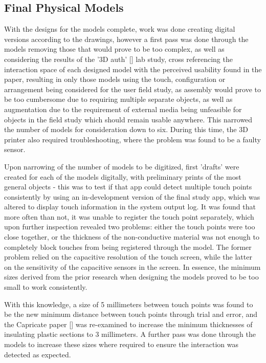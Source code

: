 \documentclass{l4proj}
\begin{document}
\subsection{Final Physical Models} \label{ssecmodels}
   
With the designs for the models complete, work was done creating digital versions according to the drawings, however a first pass was done through the models removing those that would prove to be too complex, as well as considering the results of the '3D auth' [\cite{marky20203d}] lab study, cross referencing the interaction space of each designed model with the perceived usability found in the paper, resulting in only those models using the touch, configuration or arrangement being considered for the user field study, as assembly would prove to be too cumbersome due to requiring multiple separate objects, as well as augmentation due to the requirement of external media being unfeasible for objects in the field study which should remain usable anywhere. This narrowed the number of models for consideration down to six.
During this time, the 3D printer also required troubleshooting, where the problem was found to be a faulty sensor.

Upon narrowing of the number of models to be digitized, first 'drafts' were created for each of the models digitally, with preliminary prints of the most general objects - this was to test if that app could detect multiple touch points consistently by using an in-development version of the final study app, which was altered to display touch information in the system output log. It was found that more often than not, it was unable to register the touch point separately, which upon further inspection revealed two problems: either the touch points were too close together, or the thickness of the non-conductive material was not enough to completely block touches from being registered through the model. The former problem relied on the capacitive resolution of the touch screen, while the latter on the sensitivity of the capacitive sensors in the screen. In essence, the minimum sizes derived from the prior research when designing the models proved to be too small to work consistently.

With this knowledge, a size of 5 millimeters between touch points was found to be the new minimum distance between touch points through trial and error, and the Capricate paper [\cite{schmitz2015capricate}] was re-examined to increase the minimum thicknesses of insulating plastic sections to 3 millimeters. A further pass was done through the models to increase these sizes where required to ensure the interaction was detected as expected.
\end{document}
